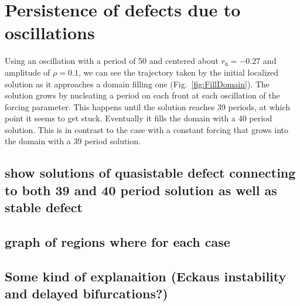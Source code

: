 \documentclass[../main/TimeForcingSHE.tex]{subfiles}
\begin{document}
\section{Persistence of defects due to oscillations}

Using an oscillation with a period of 50 and centered about $r_0=-0.27$ and amplitude of $\rho =0.1$, we can see the trajectory taken by the initial localized solution as it approaches a domain filling one (Fig.~\ref{fig:FillDomain}).  The solution grows by nucleating a period on each front at each oscillation of the forcing parameter. This happens until the solution reaches 39 periods, at which point it seems to get stuck.  Eventually it fills the domain with a 40 period solution.  This is in contrast to the case with a constant forcing that grows into the domain with a 39 period solution.  

\FIGfilldomain


\subsection{show solutions of quasistable defect connecting to both 39 and 40 period solution as well as stable defect}
\subsection{graph of regions where for each case}
\subsection{Some kind of explanaition (Eckaus instability and delayed bifurcations?)}
\end{document}

